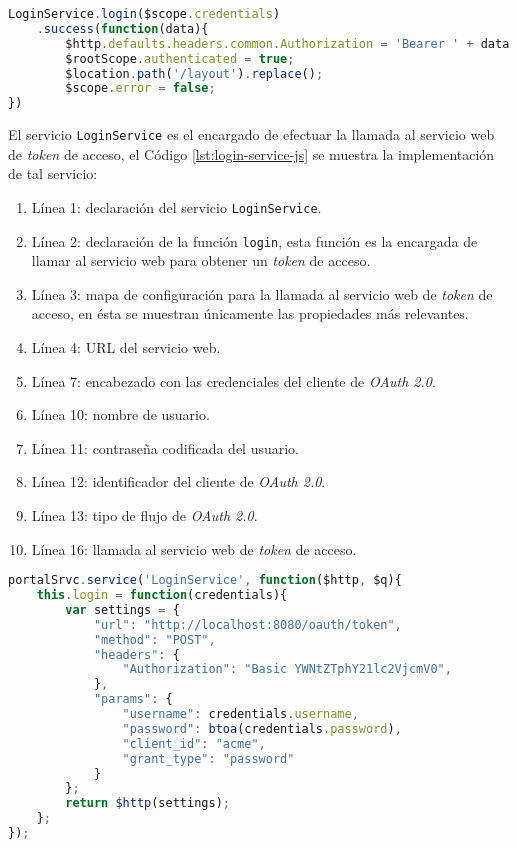 \pagebreak

\begin{lstlisting}[language=Javascript, caption={Petición de un \textit{token} de acceso.}, captionpos=b, label={lst:login-ctrl-js}]
LoginService.login($scope.credentials)
	.success(function(data){
		$http.defaults.headers.common.Authorization = 'Bearer ' + data.access_token;
		$rootScope.authenticated = true;
		$location.path('/layout').replace();
		$scope.error = false;
})
\end{lstlisting}

El servicio \texttt{LoginService} es el encargado de efectuar la llamada al servicio web de \textit{token} de acceso, el Código \ref{lst:login-service-js} se muestra la implementación de tal servicio:
\begin{enumerate}
	\item Línea 1: declaración del servicio \texttt{LoginService}.
	\item Línea 2: declaración de la función \texttt{login}, esta función es la encargada de llamar al servicio web para obtener un \textit{token} de acceso.
	\item Línea 3: mapa de configuración para la llamada al servicio web de \textit{token} de acceso, en ésta se muestran únicamente las propiedades más relevantes.
	\item Línea 4: URL del servicio web.
	\item Línea 7: encabezado con las credenciales del cliente de \textit{OAuth 2.0}.
	\item Línea 10: nombre de usuario.
	\item Línea 11: contraseña codificada del usuario.
	\item Línea 12: identificador del cliente de \textit{OAuth 2.0}.
	\item Línea 13: tipo de flujo de \textit{OAuth 2.0}.
	\item Línea 16: llamada al servicio web de \textit{token} de acceso.
\end{enumerate}

\pagebreak

\begin{lstlisting}[language=Javascript, caption={Servicio en \textit{AngularJS} para obtener un \textit{token} de acceso.}, captionpos=b, label={lst:login-service-js}]
portalSrvc.service('LoginService', function($http, $q){
	this.login = function(credentials){
		var settings = {
			"url": "http://localhost:8080/oauth/token",
			"method": "POST",
			"headers": {
				"Authorization": "Basic YWNtZTphY21lc2VjcmV0",
			},
			"params": {
				"username": credentials.username,
				"password": btoa(credentials.password),
				"client_id": "acme",
				"grant_type": "password"
			}
		};
		return $http(settings);
	};
});
\end{lstlisting}

